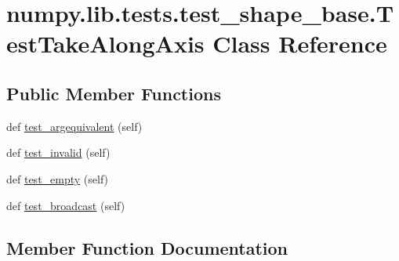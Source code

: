 \hypertarget{classnumpy_1_1lib_1_1tests_1_1test__shape__base_1_1TestTakeAlongAxis}{}\section{numpy.\+lib.\+tests.\+test\+\_\+shape\+\_\+base.\+Test\+Take\+Along\+Axis Class Reference}
\label{classnumpy_1_1lib_1_1tests_1_1test__shape__base_1_1TestTakeAlongAxis}
\subsection*{Public Member Functions}
\begin{DoxyCompactItemize}
\item 
def \hyperlink{classnumpy_1_1lib_1_1tests_1_1test__shape__base_1_1TestTakeAlongAxis_aafd4f3256ae9bf3f9570261d42e2d441}{test\+\_\+argequivalent} (self)
\item 
def \hyperlink{classnumpy_1_1lib_1_1tests_1_1test__shape__base_1_1TestTakeAlongAxis_abb83e36e0aee652b45e0379e86874bfb}{test\+\_\+invalid} (self)
\item 
def \hyperlink{classnumpy_1_1lib_1_1tests_1_1test__shape__base_1_1TestTakeAlongAxis_a63af12128898c161bb10c742174ba2e3}{test\+\_\+empty} (self)
\item 
def \hyperlink{classnumpy_1_1lib_1_1tests_1_1test__shape__base_1_1TestTakeAlongAxis_ad7b40135efe3cc43d3c6f405e26f4585}{test\+\_\+broadcast} (self)
\end{DoxyCompactItemize}


\subsection{Member Function Documentation}
\mbox{\label{classnumpy_1_1lib_1_1tests_1_1test__shape__base_1_1TestTakeAlongAxis_aafd4f3256ae9bf3f9570261d42e2d441}} 
